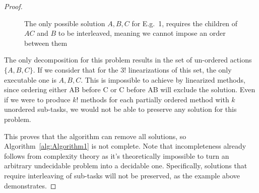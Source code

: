 \documentclass[letterpaper]{article} %
\begin{document}
\begin{proof}
\begin{figure}
{\begin{subfigure}{7cm}
			\end{subfigure}	
		}
	\end{figure}
	
	\begin{figure}
		\caption{The only possible solution $A, B, C$ for E.g.\ 1, requires the children of $AC$ and $B$ to be interleaved, meaning we cannot impose an order between them}
	\end{figure}
	
	The only decomposition for this problem results in the set of un-ordered actions $\{A, B, C\}$.
	If we consider that for the $3!$ linearizations of this set, the only executable one is $A, B, C$. This is impossible to achieve by linearized methods, since ordering either AB before C or C before AB will exclude the solution. 
	Even if we were to produce $k!$ methods for each partially ordered method with $k$ unordered sub-tasks, we would not be able to preserve any solution for this problem.
	
	This proves that the algorithm can remove all solutions, so Algorithm~\ref{alg:Algorithm1} is not complete. Note that incompleteness already follows from complexity theory as it's theoretically impossible to turn an arbitrary undecidable problem into a decidable one.
	Specifically, solutions that require interleaving of sub-tasks will not be preserved, as the example above demonstrates.
\end{proof}
\end{document}
